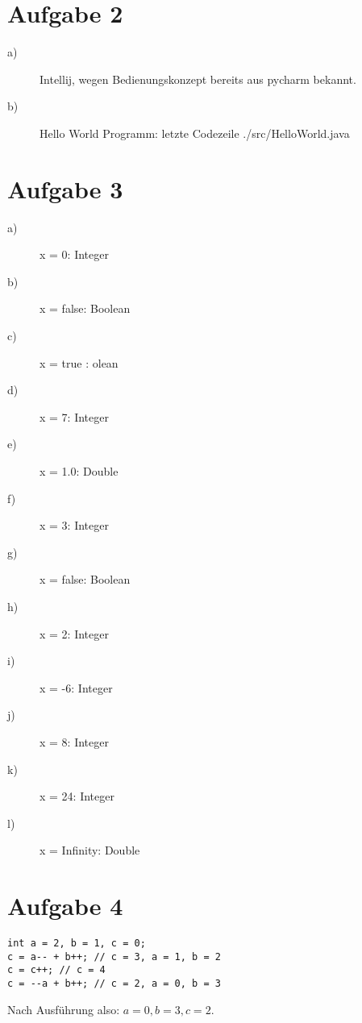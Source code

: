 \section{Aufgabe 2}
\begin{description}
\item[a)]
Intellij, wegen Bedienungskonzept bereits aus pycharm bekannt. 
\item[b)]
Hello World Programm:
 letzte Codezeile
{./src/HelloWorld.java}

\end{description}

\section{Aufgabe 3}
\begin{description}
\item[a)] x = 0: 	 Integer
\item[b)] x = false: 	 Boolean
\item[c)] x = true 	: 	olean
\item[d)] x = 7: 	 Integer
\item[e)] x = 1.0: 	 Double
\item[f)] x = 3: 	 Integer
\item[g)] x = false: 	 Boolean
\item[h)] x = 2: 	 Integer
\item[i)] x = -6: 	 Integer
\item[j)] x = 8: 	 Integer
\item[k)] x = 24: 	 Integer
\item[l)] x = Infinity: 	 Double
\end{description}

\section{Aufgabe 4}
\begin{lstlisting}
int a = 2, b = 1, c = 0;
c = a-- + b++; // c = 3, a = 1, b = 2
c = c++; // c = 4
c = --a + b++; // c = 2, a = 0, b = 3
\end{lstlisting}
Nach Ausführung also: $a = 0, b = 3, c = 2$.

